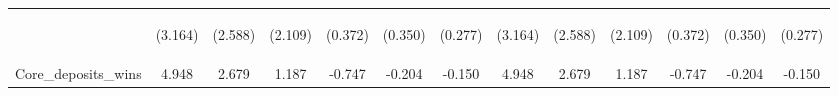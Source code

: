 \documentclass[]{article}
\begin{document}
\begin{center}
\begin{tabular}{lcccccccccccc}
\vspace{4pt} & \begin{footnotesize}(3.164)\end{footnotesize} & \begin{footnotesize}(2.588)\end{footnotesize} & \begin{footnotesize}(2.109)\end{footnotesize} & \begin{footnotesize}(0.372)\end{footnotesize} & \begin{footnotesize}(0.350)\end{footnotesize} & \begin{footnotesize}(0.277)\end{footnotesize} & \begin{footnotesize}(3.164)\end{footnotesize} & \begin{footnotesize}(2.588)\end{footnotesize} & \begin{footnotesize}(2.109)\end{footnotesize} & \begin{footnotesize}(0.372)\end{footnotesize} & \begin{footnotesize}(0.350)\end{footnotesize} & \begin{footnotesize}(0.277)\end{footnotesize} \\
Core\_deposits\_wins & 4.948 & 2.679 & 1.187 & -0.747 & -0.204 & -0.150 & 4.948 & 2.679 & 1.187 & -0.747 & -0.204 & -0.150 \\

\end{tabular}
\end{center}
\end{document}
